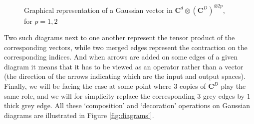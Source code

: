 \documentclass{amsart}
\newcommand{\C}{\mathbf{C}}
\newcommand{\ket}[1]{| #1 \rangle}
\begin{document}
\begin{figure}[h]
    \caption{Graphical representation of a Gaussian vector in $\C^d\otimes(\C^D)^{\otimes 2p}$, for $p=1,2$}
    \label{fig:diagrams}
    \begin{center}
    \end{center}
\end{figure}

Two such diagrams next to one another represent the tensor product of the corresponding vectors, while two merged edges represent the contraction on the corresponding indices. And when arrows are added on some edges of a given diagram it means that it has to be viewed as an operator rather than a vector (the direction of the arrows indicating which are the input and output spaces). Finally, we will be facing the case at some point where $3$ copies of $\C^D$ play the same role, and we will for simplicity replace the corresponding $3$ grey edges by $1$ thick grey edge. All these `composition' and `decoration' operations on Gaussian diagrams are illustrated in Figure \ref{fig:diagrams'}.
\end{document}
